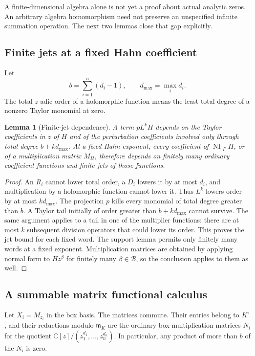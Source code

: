 \documentclass[11pt,letterpaper]{article}
\newtheorem{lemma}[theorem]{Lemma}
\theoremstyle{definition}
\theoremstyle{remark}
\newcommand{\C}{\mathbb C}
\newcommand{\mm}{\mathfrak m}
\newcommand{\BB}{\mathcal B}
\newcommand{\NF}{\operatorname{NF}}
\numberwithin{equation}{section}
\begin{document}
A finite-dimensional algebra alone is not yet a proof about actual analytic zeros. An arbitrary algebra homomorphism need not preserve an unspecified infinite summation operation. The next two lemmas close that gap explicitly.

\subsection{Finite jets at a fixed Hahn coefficient}
Let
\[
 b=\sum_{i=1}^n(d_i-1),\qquad d_{\max}=\max_i d_i.
\]
The total $z$-adic order of a holomorphic function means the least total degree of a nonzero Taylor monomial at zero.

\begin{lemma}[Finite-jet dependence]\label{lem:jets}
A term $pL^kH$ depends on the Taylor coefficients in $z$ of $H$ and of the perturbation coefficients involved only through total degree $b+kd_{\max}$. At a fixed Hahn exponent, every coefficient of $\NF_FH$, or of a multiplication matrix $M_H$, therefore depends on finitely many ordinary coefficient functions and finite jets of those functions.
\end{lemma}
\begin{proof}
An $R_i$ cannot lower total order, a $D_i$ lowers it by at most $d_i$, and multiplication by a holomorphic function cannot lower it. Thus $L^k$ lowers order by at most $kd_{\max}$. The projection $p$ kills every monomial of total degree greater than $b$. A Taylor tail initially of order greater than $b+kd_{\max}$ cannot survive. The same argument applies to a tail in one of the multiplier functions: there are at most $k$ subsequent division operators that could lower its order. This proves the jet bound for each fixed word. The support lemma permits only finitely many words at a fixed exponent. Multiplication matrices are obtained by applying normal form to $Hz^\beta$ for finitely many $\beta\in\BB$, so the conclusion applies to them as well.
\end{proof}

\subsection{A summable matrix functional calculus}
Let $X_i=M_{z_i}$ in the box basis. The matrices commute. Their entries belong to $K^\circ$, and their reductions modulo $\mm_K$ are the ordinary box-multiplication matrices $N_i$ for the quotient $\C[z]/(z_1^{d_1},\ldots,z_n^{d_n})$. In particular, any product of more than $b$ of the $N_i$ is zero.
\end{document}
